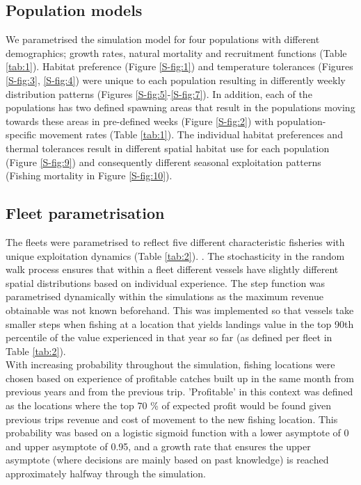 \documentclass[review]{elsarticle}
\begin{document}
\subsection{Population models}

We parametrised the simulation model for four populations with different
demographics; growth rates, natural mortality and recruitment functions (Table
\ref{tab:1}). Habitat preference (Figure \ref{S-fig:1}) and temperature
tolerances (Figures \ref{S-fig:3}, \ref{S-fig:4}) were unique to each
population resulting in differently weekly distribution patterns (Figures
\ref{S-fig:5}-\ref{S-fig:7}). In addition, each of the populations has two
defined spawning areas that result in the populations moving towards these
areas in pre-defined weeks (Figure \ref{S-fig:2}) with population-specific
movement rates (Table \ref{tab:1}). The individual habitat preferences and
thermal tolerances result in different spatial habitat use for each population
(Figure \ref{S-fig:9}) and consequently different seasonal exploitation
patterns (Fishing mortality in Figure \ref{S-fig:10}). 

\subsection{Fleet parametrisation}

The fleets were parametrised to reflect five different characteristic fisheries
with unique exploitation dynamics (Table \ref{tab:2}).  .  The
stochasticity in the random walk process ensures that within a fleet different
vessels have slightly different spatial distributions based on individual
experience. The step function was parametrised dynamically within the
simulations as the maximum revenue obtainable was not known beforehand. This
was implemented so that vessels take smaller steps when fishing at a location
that yields landings value in the top 90th percentile of the value experienced
in that year so far (as defined per fleet in Table \ref{tab:2}). \\

With increasing probability throughout the simulation, fishing locations were
chosen based on experience of profitable catches built up in the same month
from previous years and from the previous trip. 'Profitable' in this context
was defined as the locations where the top 70 \% of expected profit would be
found given previous trips revenue and cost of movement to the new fishing
location.  This probability was based on a logistic sigmoid function with a
lower asymptote of 0 and upper asymptote of 0.95, and a growth rate that 
ensures the upper asymptote (where decisions are mainly based on past
knowledge) is reached approximately halfway through the simulation.  \\
\end{document}
